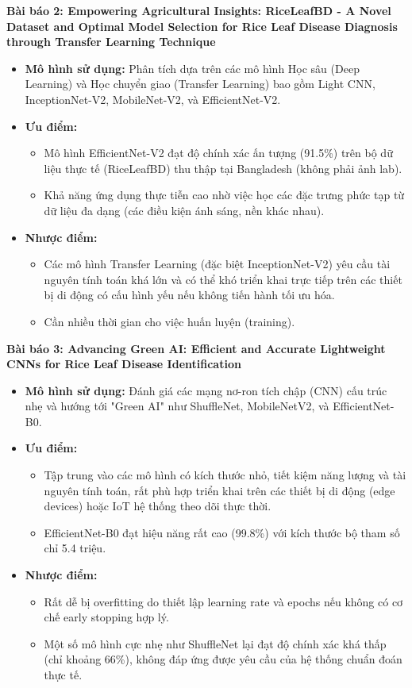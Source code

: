 \documentclass[12pt,a4paper]{article}
\begin{document}
\textbf{Bài báo 2: Empowering Agricultural Insights: RiceLeafBD - A Novel Dataset and Optimal Model Selection for Rice Leaf Disease Diagnosis through Transfer Learning Technique}
\begin{itemize}
    \item \textbf{Mô hình sử dụng:} Phân tích dựa trên các mô hình Học sâu (Deep Learning) và Học chuyển giao (Transfer Learning) bao gồm Light CNN, InceptionNet-V2, MobileNet-V2, và EfficientNet-V2.
    \item \textbf{Ưu điểm:} 
    \begin{itemize}
        \item Mô hình EfficientNet-V2 đạt độ chính xác ấn tượng (91.5\%) trên bộ dữ liệu thực tế (RiceLeafBD) thu thập tại Bangladesh (không phải ảnh lab).
        \item Khả năng ứng dụng thực tiễn cao nhờ việc học các đặc trưng phức tạp từ dữ liệu đa dạng (các điều kiện ánh sáng, nền khác nhau).
    \end{itemize}
    \item \textbf{Nhược điểm:} 
    \begin{itemize}
        \item Các mô hình Transfer Learning (đặc biệt InceptionNet-V2) yêu cầu tài nguyên tính toán khá lớn và có thể khó triển khai trực tiếp trên các thiết bị di động có cấu hình yếu nếu không tiến hành tối ưu hóa.
        \item Cần nhiều thời gian cho việc huấn luyện (training).
    \end{itemize}
\end{itemize}

\textbf{Bài báo 3: Advancing Green AI: Efficient and Accurate Lightweight CNNs for Rice Leaf Disease Identification}
\begin{itemize}
    \item \textbf{Mô hình sử dụng:} Đánh giá các mạng nơ-ron tích chập (CNN) cấu trúc nhẹ và hướng tới "Green AI" như ShuffleNet, MobileNetV2, và EfficientNet-B0.
    \item \textbf{Ưu điểm:} 
    \begin{itemize}
        \item Tập trung vào các mô hình có kích thước nhỏ, tiết kiệm năng lượng và tài nguyên tính toán, rất phù hợp triển khai trên các thiết bị di động (edge devices) hoặc IoT hệ thống theo dõi thực thời.
        \item EfficientNet-B0 đạt hiệu năng rất cao (99.8\%) với kích thước bộ tham số chỉ 5.4 triệu.
    \end{itemize}
    \item \textbf{Nhược điểm:} 
    \begin{itemize}
        \item Rất dễ bị overfitting do thiết lập learning rate và epochs nếu không có cơ chế early stopping hợp lý.
        \item Một số mô hình cực nhẹ như ShuffleNet lại đạt độ chính xác khá thấp (chỉ khoảng 66\%), không đáp ứng được yêu cầu của hệ thống chuẩn đoán thực tế.
    \end{itemize}
\end{itemize}
\end{document}
